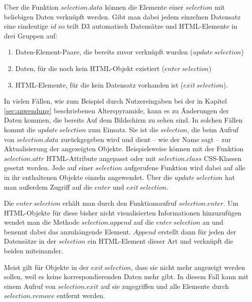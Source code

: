 Über die Funktion $selection.data$ können die Elemente einer $selection$ mit beliebigen Daten verknüpft werden. Gibt man dabei jedem einzelnen Datensatz eine eindeutige $id$ so teilt D3 automatisch Datensätze und HTML-Elemente in drei Gruppen auf: 
\begin{enumerate}
	\item Daten-Element-Paare, die bereits zuvor verknüpft wurden ($update\ selection$)
	\item Daten, für die noch kein HTML-Objekt existiert ($enter\ selection$)
	\item HTML-Elemente, für die kein Datensatz vorhanden ist ($exit\ selection$).
\end{enumerate}

In vielen Fällen, wie zum Beispiel durch Nutzereingaben bei der in Kapitel \ref{sec:anwendung} beschriebenen Alterspyramide, kann es zu Änderungen der Daten kommen, die bereits Auf dem Bildschirm zu sehen sind. In solchen Fällen kommt die $update\ selection$ zum Einsatz. Sie ist die $selection$, die beim Aufruf von $selection.data$ zurückgegeben wird und dient -- wie der Name sagt -- zur Aktualisierung der angezeigten Objekte. Beispielsweise können mit der Funktion $selection.attr$ HTML-Attribute angepasst oder mit $selection.class$ CSS-Klassen gesetzt werden. Jede auf einer $selection$ aufgerufene Funktion wird dabei auf alle in ihr enthaltenen Objekte einzeln angewendet. Über die $update\ selection$ hat man außerdem Zugriff auf die $enter$ und $exit\ selection$.

Die $enter\ selection$ erhält man durch den Funktionsaufruf $selection.enter$. Um HTML-Objekte für diese bisher nicht visualisierten Informationen hinzuzufügen wendet man die Methode $selection.append$ auf die $enter\ selection$ an und benennt dabei das anzuhängende Element. $Append$ erstellt dann für jeden der Datensätze in der $selection$ ein HTML-Element dieser Art und verknüpft die beiden miteinander.

Meist gilt für Objekte in der $exit\ selection$, dass sie nicht mehr angezeigt werden sollen, weil es keine korrespondierenden Daten mehr gibt. In diesem Fall kann mit einem Aufruf von $selection.exit$ auf sie zugegriffen und alle Elemente durch $selection.remove$ entfernt werden.

